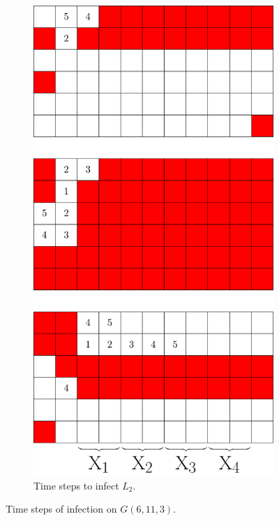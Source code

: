 \begin{figure}[]
\begin{subfigure}[t]{0.2915\textwidth}
\includegraphics[width=\textwidth]{figures/7/6x11x3_L2_numbered_heatmap.pdf}
\caption{Time steps to infect $L_2$.}
\label{fig:6x11x3_timesteps}
\end{subfigure}
\caption{Time steps of infection on $G(6,11,3)$.}
\label{fig:}
\end{figure} 

